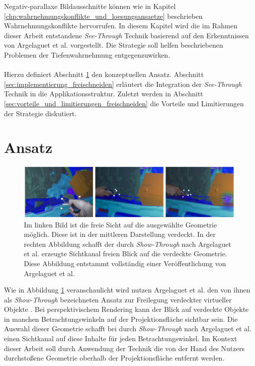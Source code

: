 Negativ-parallaxe Bildausschnitte können wie in Kapitel \ref{chp:wahrnehmungskonflikte_und_loesungsansaetze} beschrieben Wahrnehmungskonflikte hervorrufen. In diesem  Kapitel wird die im Rahmen dieser Arbeit entstandene \emph{See-Through} Technik basierend auf den Erkenntnissen von Argelaguet et al. \cite{argelaguet:2010} vorgestellt. Die Strategie soll helfen beschriebenen Problemen der Tiefenwahrnehmung entgegenzuwirken.
\\\\
Hierzu definiert Abschnitt \ref{sec:ansatz} den konzeptuellen Ansatz. Abschnitt \ref{sec:implementierung_freischneiden} erläutert die Integration der \emph{See-Through} Technik in die Applikationsstruktur. Zuletzt werden in Abschnitt \ref{sec:vorteile_und_limitierungen_freischneiden} die Vorteile und Limitierungen der Strategie diskutiert.


\section{Ansatz}
\label{sec:ansatz}

\begin{figure}
	\begin{center}
		\includegraphics[width=12cm]{img/show_through_related.pdf}
	\end{center}
	\caption{Im linken Bild ist die freie Sicht auf die ausgewählte Geometrie möglich. Diese ist in der mittleren Darstellung verdeckt. In der rechten Abbildung schafft der durch \emph{Show-Through} nach Argelaguet et al. erzeugte Sichtkanal freien Blick auf die verdeckte Geometrie. Diese Abbildung entstammt vollständig einer Veröffentlichung von Argelaguet et al. \cite{argelaguet:2010}} 
	\label{fig:show_through_related}
\end{figure}

Wie in Abbildung \ref{fig:show_through_related} veranschaulicht wird nutzen Argelaguet et al. den von ihnen als \emph{Show-Through} bezeichneten Ansatz zur Freilegung verdeckter virtueller Objekte \cite{argelaguet:2010}. Bei perspektivischem Rendering kann der Blick auf verdeckte Objekte in manchen Betrachtungswinkeln auf der Projektionsfläche sichtbar sein. Die Auswahl dieser Geometrie schafft bei durch \emph{Show-Through} nach Argelaguet et al. einen Sichtkanal auf diese Inhalte für jeden Betrachtungswinkel. Im Kontext dieser Arbeit soll durch Anwendung der Technik die von der Hand des Nutzers durchstoßene Geometrie oberhalb der Projektionsfläche entfernt werden.


